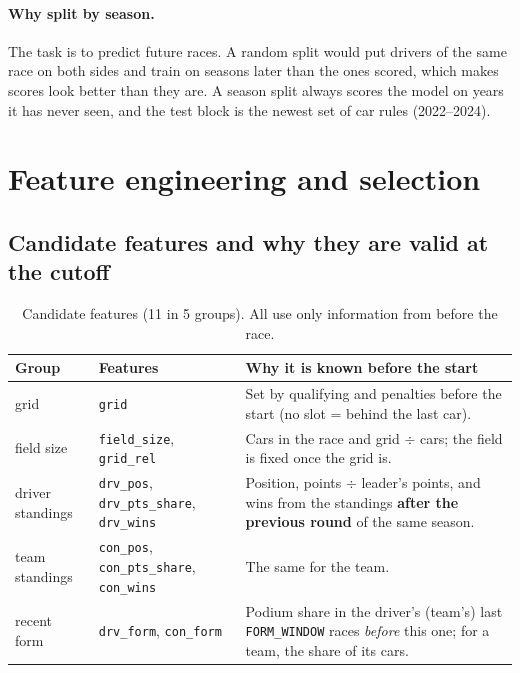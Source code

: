 \documentclass[11pt,a4paper]{article}
\newcommand{\code}[1]{\texttt{#1}}
\begin{document}
\paragraph{Why split by season.} The task is to predict future races. A random split would put drivers of the same race on both sides and train on seasons later than the ones scored, which makes scores look better than they are. A season split always scores the model on years it has never seen, and the test block is the newest set of car rules (2022--2024).

\section{Feature engineering and selection}

\subsection{Candidate features and why they are valid at the cutoff}

\begin{table}[H]
\centering\small
\caption{Candidate features (11 in 5 groups). All use only information from before the race.}
\label{tab:candidates}
\begin{tabularx}{\linewidth}{llX}
\toprule
Group & Features & Why it is known before the start \\
\midrule
grid & \code{grid} & Set by qualifying and penalties before the start (no slot = behind the last car). \\
field size & \code{field\_size}, \code{grid\_rel} & Cars in the race and grid $\div$ cars; the field is fixed once the grid is. \\
driver standings & \code{drv\_pos}, \code{drv\_pts\_share}, \code{drv\_wins} & Position, points $\div$ leader's points, and wins from the standings \textbf{after the previous round} of the same season. \\
team standings & \code{con\_pos}, \code{con\_pts\_share}, \code{con\_wins} & The same for the team. \\
recent form & \code{drv\_form}, \code{con\_form} & Podium share in the driver's (team's) last \code{FORM\_WINDOW} races \emph{before} this one; for a team, the share of its cars. \\
\bottomrule
\end{tabularx}
\end{table}
\end{document}
